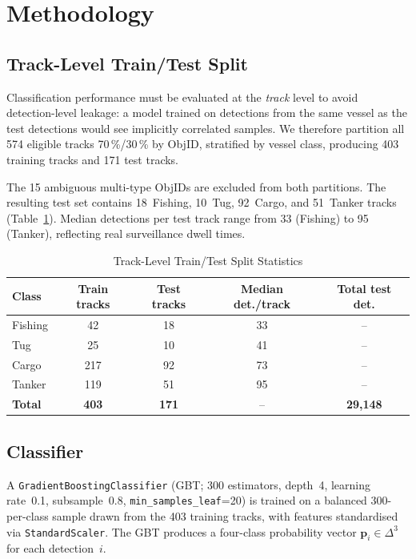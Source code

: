 \documentclass[10pt,journal,compsoc]{IEEEtran}
\begin{document}
\section{Methodology}\label{sec:method}

\subsection{Track-Level Train/Test Split}

Classification performance must be evaluated at the \emph{track} level to
avoid detection-level leakage: a model trained on detections from the same
vessel as the test detections would see implicitly correlated samples.  We
therefore partition all 574 eligible tracks 70\,\%/30\,\% by ObjID,
stratified by vessel class, producing 403 training tracks and 171 test tracks.

The 15 ambiguous multi-type ObjIDs are excluded from both partitions.  The
resulting test set contains 18~Fishing, 10~Tug, 92~Cargo, and 51~Tanker tracks
(Table~\ref{tab:split}).  Median detections per test track range from 33
(Fishing) to 95 (Tanker), reflecting real surveillance dwell times.

\begin{table}[!t]
\centering\small
\caption{Track-Level Train/Test Split Statistics}
\label{tab:split}
\begin{tabular}{lcccc}
\toprule
Class & Train tracks & Test tracks & Median det./track & Total test det. \\
\midrule
Fishing & 42 & 18 & 33 & -- \\
Tug     & 25 & 10  & 41  & -- \\
Cargo   & 217 & 92 & 73 & -- \\
Tanker  & 119 & 51 & 95 & -- \\
\midrule
\textbf{Total} & \textbf{403} & \textbf{171} & -- & \textbf{29,148} \\
\bottomrule
\end{tabular}
\end{table}

\subsection{Classifier}

A \texttt{GradientBoostingClassifier} (GBT; 300 estimators, depth~4,
learning rate~0.1, subsample~0.8, \texttt{min\_samples\_leaf}=20) is trained on
a balanced 300-per-class sample drawn from the 403 training tracks, with
features standardised via \texttt{StandardScaler}.  The GBT produces a
four-class probability vector $\mathbf{p}_i \in \Delta^3$ for each detection~$i$.
\end{document}
